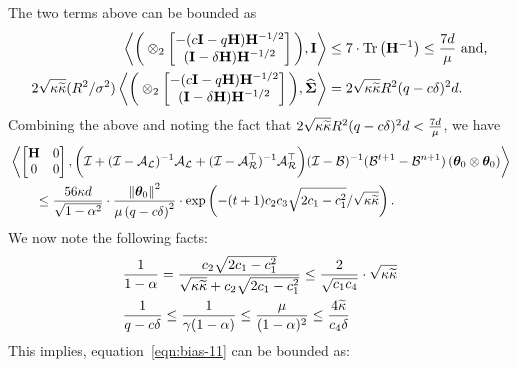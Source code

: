 	The two terms above can be bounded as
	\begin{align*}
		\iprod{\bigg(\otimes_2\begin{bmatrix} -(c\eye-\g\Cov)\Cov^{-1/2}\\(\eye-\delta\Cov)\Cov^{-1/2}\end{bmatrix}\bigg)}{\eye} &\leq 7\cdot \trace{\inv{\Cov}} \leq \frac{7d}{\mu} \mbox{ and,} \\
		2 \sqrt{\cnH\cnS} (\infbound/\sigma^2) \iprod{\bigg(\otimes_2\begin{bmatrix} -(c\eye-\g\Cov)\Cov^{-1/2}\\(\eye-\delta\Cov)\Cov^{-1/2}\end{bmatrix}\bigg)}{\Sighat} &=  2 \sqrt{\cnH\cnS} \infbound (\g - c\delta)^2 d.
	\end{align*}
	Combining the above and noting the fact that $2 \sqrt{\cnH\cnS} \infbound (\g - c\delta)^2 d<\frac{7 d}{\mu}$, we have
	\begin{align}
		&\iprod{\begin{bmatrix}
			\Cov & \zero \\ \zero & \zero
			\end{bmatrix}}{\bigg( \eyeT + (\eyeT-\AL)^{-1}\AL + (\eyeT-\AR\T)^{-1}\AR\T\bigg) (\eyeT-\BT)^{-1}(\BT^{t+1}-\BT^{n+1}) \left(\thetat[0]\otimes \thetat[0]\right)} \nonumber\\ 
		&\qquad \leq \frac{56 \cnH d }{\sqrt{1-\alpha^2}} \cdot \frac{\norm{\thetat[0]}^2}{\mu \left(\g - c \delta\right)^2} \cdot \exp\left(-(t+1) \ctwo \cthree \sqrt{2\cone - \cone^2}/\sqrt{\cnH\cnS}\right).\label{eqn:bias-11}
	\end{align}
	We now note the following facts:
	\begin{align*}
		&\frac{1}{1-\alpha}=\frac{\ctwo\sqrt{2\cone-\cone^2}}{\sqrt{\cnH\cnS}+\ctwo\sqrt{2\cone-\cone^2}}\leq\frac{2}{\sqrt{\cone\cfour}}\cdot\sqrt{\cnH\cnS}\\
		&\frac{1}{\g-c\delta}\leq\frac{1}{\gamma(1-\alpha)}\leq\frac{\mu}{(1-\alpha)^2}\leq\frac{4\cnS}{\cfour\delta}
	\end{align*}
	This implies, equation~\ref{eqn:bias-11} can be bounded as:
